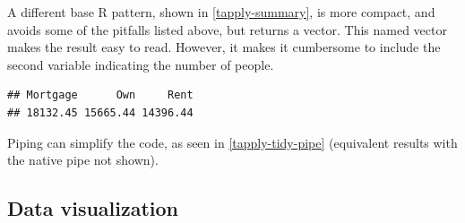\documentclass[12pt]{article}
\newenvironment{Shaded}{\begin{snugshade}}{\end{snugshade}}
\newcommand{\AttributeTok}[1]{\textcolor[rgb]{0.77,0.63,0.00}{#1}}
\newcommand{\ConstantTok}[1]{\textcolor[rgb]{0.00,0.00,0.00}{#1}}
\newcommand{\FunctionTok}[1]{\textcolor[rgb]{0.00,0.00,0.00}{#1}}
\newcommand{\NormalTok}[1]{#1}
\newcommand{\SpecialCharTok}[1]{\textcolor[rgb]{0.00,0.00,0.00}{#1}}
\begin{document}
A different base R pattern, shown in \ref{tapply-summary}, is more
compact, and avoids some of the pitfalls listed above, but returns a
vector. This named vector makes the result easy to read. However, it
makes it cumbersome to include the second variable indicating the number
of people.

\linespread{1}

\begin{Shaded}
\end{Shaded}

\begin{verbatim}
## Mortgage      Own     Rent 
## 18132.45 15665.44 14396.44
\end{verbatim}


\label{tapply-summary} \linespread{2}
\vspace{3mm}\setlength{\parindent}{15pt}

Piping can simplify the code, as seen in \ref{tapply-tidy-pipe}
(equivalent results with the native pipe not shown).

\linespread{1}

\begin{Shaded}
\end{Shaded}


\label{tapply-tidy-pipe} \linespread{2}
\vspace{3mm}\setlength{\parindent}{15pt}

\hypertarget{data-visualization}{%
\subsection{Data visualization}\label{data-visualization}}
\end{document}
